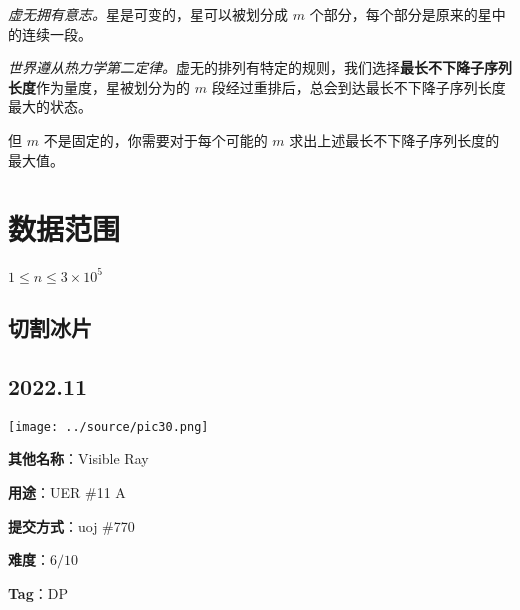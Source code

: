\documentclass[a4paper,10pt]{article}
\begin{document}
\textit{虚无拥有意志。}星是可变的，星可以被划分成 $m$ 个部分，每个部分是原来的星中的连续一段。

\textit{世界遵从热力学第二定律。}虚无的排列有特定的规则，我们选择\textbf{最长不下降子序列长度}作为量度，星被划分为的 $m$ 段经过重排后，总会到达最长不下降子序列长度最大的状态。

但 $m$ 不是固定的，你需要对于每个可能的 $m$ 求出上述最长不下降子序列长度的最大值。

\section*{数据范围}

$1\leq n\leq 3\times 10^5$

\newpage

\vspace*{\fill}
\begin{center}

\section{切割冰片}

\subsection*{2022.11}

\vspace{10pt}

\texttt{[image: ../source/pic30.png]}

\vspace{10pt}

\textbf{其他名称}：Visible Ray

\vspace{10pt}

\textbf{用途}：UER \#11 A

\vspace{10pt}

\textbf{提交方式}：uoj \#770

\vspace{10pt}

\textbf{难度}：$6/10$

\vspace{10pt}

\textbf{Tag}：DP

\end{center}
\vspace*{\fill}

\newpage
\end{document}
